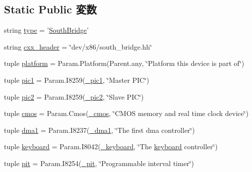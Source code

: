 \subsection*{Static Public 変数}
\begin{DoxyCompactItemize}
\item 
string \hyperlink{classSouthBridge_1_1SouthBridge_acce15679d830831b0bbe8ebc2a60b2ca}{type} = '\hyperlink{classSouthBridge_1_1SouthBridge}{SouthBridge}'
\item 
string \hyperlink{classSouthBridge_1_1SouthBridge_a17da7064bc5c518791f0c891eff05fda}{cxx\_\-header} = \char`\"{}dev/x86/south\_\-bridge.hh\char`\"{}
\item 
tuple \hyperlink{classSouthBridge_1_1SouthBridge_ae6d09ca44893db6cdb66d62deaa1aefd}{platform} = Param.Platform(Parent.any, \char`\"{}Platform this device is part of\char`\"{})
\item 
tuple \hyperlink{classSouthBridge_1_1SouthBridge_a6962be624c6ef72d6f9bab2eaeb6b188}{pic1} = Param.I8259(\hyperlink{classSouthBridge_1_1SouthBridge_a2a9738033aae844627554246f92f6e3b}{\_\-pic1}, \char`\"{}Master PIC\char`\"{})
\item 
tuple \hyperlink{classSouthBridge_1_1SouthBridge_aaeda2daedd8669c817d979b24786a533}{pic2} = Param.I8259(\hyperlink{classSouthBridge_1_1SouthBridge_abaad4b42924c6da51b3284d582a140bb}{\_\-pic2}, \char`\"{}Slave PIC\char`\"{})
\item 
tuple \hyperlink{classSouthBridge_1_1SouthBridge_ab5666bd6ecb7df81d23c2fc3f545c7fc}{cmos} = Param.Cmos(\hyperlink{classSouthBridge_1_1SouthBridge_abc6e236abbfb15f376d3e6779638bdde}{\_\-cmos}, \char`\"{}CMOS memory and real time clock device\char`\"{})
\item 
tuple \hyperlink{classSouthBridge_1_1SouthBridge_ad47592c271ed33e6ee6d55f08e27e774}{dma1} = Param.I8237(\hyperlink{classSouthBridge_1_1SouthBridge_ab222e5bd18f00cb090a1b0efdcd86d0c}{\_\-dma1}, \char`\"{}The first dma controller\char`\"{})
\item 
tuple \hyperlink{classSouthBridge_1_1SouthBridge_a1802a55d326035443e057035de162e6a}{keyboard} = Param.I8042(\hyperlink{classSouthBridge_1_1SouthBridge_a9fc8cd80d0fc4c822b4d8ad51fd1d49c}{\_\-keyboard}, \char`\"{}The \hyperlink{classSouthBridge_1_1SouthBridge_a1802a55d326035443e057035de162e6a}{keyboard} controller\char`\"{})
\item 
tuple \hyperlink{classSouthBridge_1_1SouthBridge_a5f9a4e8ee268919eef3700174e7db103}{pit} = Param.I8254(\hyperlink{classSouthBridge_1_1SouthBridge_a0298229d3025c8eb875998bb9160c43d}{\_\-pit}, \char`\"{}Programmable interval timer\char`\"{})

\end{DoxyCompactItemize}
